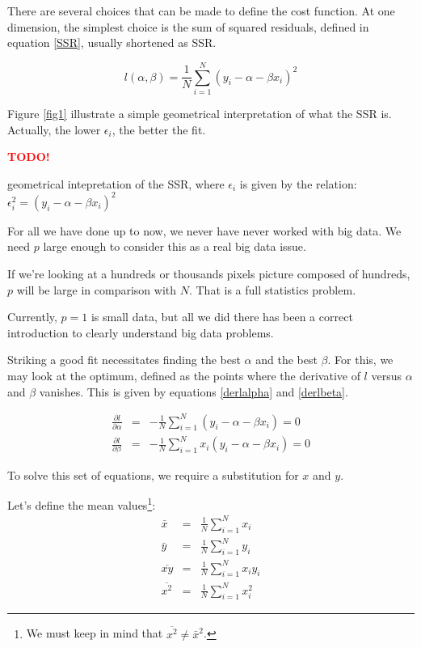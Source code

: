 \documentclass[a4paper]{tufte-book}
\newcommand{\TODO}{\textcolor{red}{\bf TODO!}\xspace}
\begin{document}
There are several choices that can be made to define the cost function. At one
dimension, the simplest choice is the sum of squared residuals, defined in
equation \ref{SSR}, usually shortened as SSR.

\begin{equation}
    l(\alpha,\beta) = \frac{1}{N} \sum_{i=1}^N (y_i - \alpha - \beta x_i )^2
    \label{SSR}
\end{equation} 

Figure \ref{fig1} illustrate a simple geometrical interpretation of what the SSR
is. Actually, the lower $\epsilon_i$, the better the fit.

\begin{marginfigure}
\TODO
\caption{geometrical intepretation of the SSR, where $\epsilon_i$ is given by the relation: $\epsilon_i^2 = (y_i - \alpha - \beta x_i)^2$}
\label{fig1}
\end{marginfigure}

For all we have done up to now, we never have never worked with big data. We
need $p$ large enough to consider this as a real big data issue.

If we’re looking at a hundreds or thousands pixels picture composed of hundreds, 
$p$ will be large in comparison with $N$. That is a full statistics problem.

Currently, $p=1$ is small data, but all we did there has been a correct
introduction to clearly understand big data problems.

Striking a good fit necessitates finding the best $\alpha$ and the best $\beta$.
For this, we may look at the optimum, defined as the points where the derivative
of $l$ versus $\alpha$ and $\beta$ vanishes. This is given by equations
\ref{derlalpha} and \ref{derlbeta}.

\begin{eqnarray}
    \frac{\partial l}{\partial \alpha} & = & - \frac{1}{N} \sum_{i=1}^N (y_i - \alpha - \beta x_i) = 0
    \label{derlalpha}\\
    \frac{\partial l}{\partial \beta} & =&  -\frac{1}{N} \sum_{i=1}^N x_i (y_i - \alpha -  \beta x_i) = 0
    \label{derlbeta}
\end{eqnarray}

To solve this set of equations, we require a substitution for $x$ and $y$.

Let’s define the mean values\footnote{We must keep in mind that $\overline{x^2} \neq \bar{x}^2$.}:
\begin{eqnarray}
    \bar{x} & = & \frac{1}{N} \sum_{i=1}^N x_i\\
    \bar{y} & = & \frac{1}{N} \sum_{i=1}^N y_i\\
    \overline{xy} & =&  \frac{1}{N} \sum_{i=1}^{N} x_i y_i\\
    \overline{x^2} & =&  \frac{1}{N} \sum_{i=1}^N x_i^2
\end{eqnarray}
\end{document}
